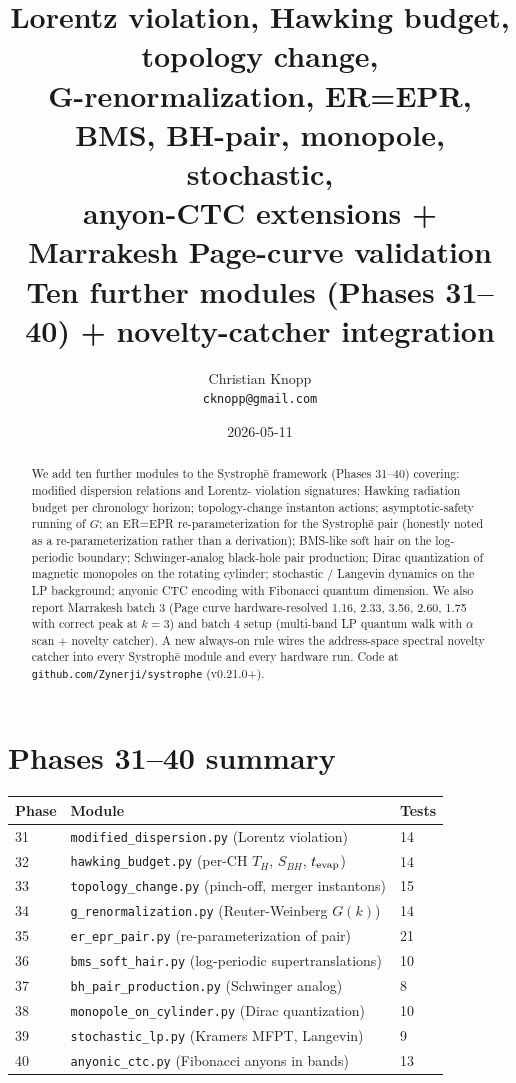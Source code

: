 \documentclass[11pt,a4paper]{article}
\title{\bfseries Lorentz violation, Hawking budget, topology change,\\
G-renormalization, ER=EPR, BMS, BH-pair, monopole, stochastic,\\
anyon-CTC extensions + Marrakesh Page-curve validation\\
\large Ten further modules (Phases 31--40) + novelty-catcher integration}
\author{Christian Knopp\\\texttt{cknopp@gmail.com}}
\date{2026-05-11}
\begin{document}
\maketitle

\begin{abstract}
We add ten further modules to the Systroph\=e framework
(Phases 31--40) covering: modified dispersion relations and Lorentz-
violation signatures; Hawking radiation budget per chronology horizon;
topology-change instanton actions; asymptotic-safety running of $G$;
an ER=EPR re-parameterization for the Systroph\=e pair (honestly noted
as a re-parameterization rather than a derivation); BMS-like soft hair
on the log-periodic boundary; Schwinger-analog black-hole pair production;
Dirac quantization of magnetic monopoles on the rotating cylinder;
stochastic / Langevin dynamics on the LP background; anyonic CTC
encoding with Fibonacci quantum dimension. We also report Marrakesh
batch 3 (Page curve hardware-resolved 1.16, 2.33, 3.56, 2.60, 1.75 with
correct peak at $k=3$) and batch 4 setup (multi-band LP quantum walk
with $\alpha$ scan + novelty catcher). A new always-on rule wires the
address-space spectral novelty catcher into every Systroph\=e module
and every hardware run. Code at \texttt{github.com/Zynerji/systrophe}
(v0.21.0+).
\end{abstract}

\section{Phases 31--40 summary}

\begin{tabular}{lll}
\toprule
Phase & Module & Tests \\
\midrule
31 & \texttt{modified\_dispersion.py} (Lorentz violation) & 14 \\
32 & \texttt{hawking\_budget.py} (per-CH $T_H$, $S_{BH}$, $t_{\rm evap}$) & 14 \\
33 & \texttt{topology\_change.py} (pinch-off, merger instantons) & 15 \\
34 & \texttt{g\_renormalization.py} (Reuter-Weinberg $G(k)$) & 14 \\
35 & \texttt{er\_epr\_pair.py} (re-parameterization of pair) & 21 \\
36 & \texttt{bms\_soft\_hair.py} (log-periodic supertranslations) & 10 \\
37 & \texttt{bh\_pair\_production.py} (Schwinger analog) & 8 \\
38 & \texttt{monopole\_on\_cylinder.py} (Dirac quantization) & 10 \\
39 & \texttt{stochastic\_lp.py} (Kramers MFPT, Langevin) & 9 \\
40 & \texttt{anyonic\_ctc.py} (Fibonacci anyons in bands) & 13 \\
\bottomrule
\end{tabular}
\end{document}
